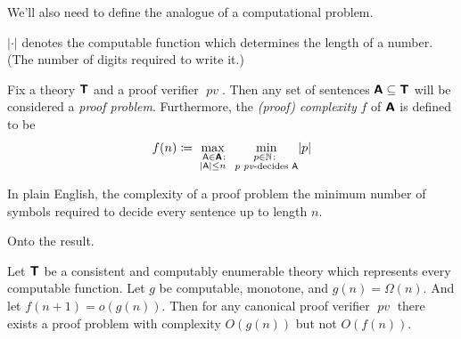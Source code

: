 \documentclass{article}
\theoremstyle{customstyle}
\newcommand{\fm}[1]{\mathsf{#1}}
\DeclareMathOperator{\pc}{\mathit{pv}}
\newcommand{\T}{\textbf{\textsf{T}}}
\newcommand{\A}{\textbf{\textsf{A}}}
\begin{document}
We'll also need to define the analogue of a computational problem.

\begin{definition}
  $\lvert \cdot \rvert$ denotes the computable function which determines the length of a number. (The number of digits required to write it.)
\end{definition}

\begin{definition}
  Fix a theory $\T$ and a proof verifier $\pc$. Then any set of sentences $\A \subseteq \T$ will be considered a \emph{proof problem}. Furthermore, the \textit{(proof) complexity} $f$ of $\A$ is defined to be
  \[
    f(n) \coloneqq \max_{\substack{\enskip\fm{A} \in \A \colon\\ \lvert \fm{A} \rvert \leq n}} \; \min_{\substack{p \in \mathbb{N} \colon\\ p \text{ $\pc$-decides } \fm{A}}} \lvert p \rvert
  \]
\end{definition}
In plain English, the complexity of a proof problem the minimum number of symbols required to decide every sentence up to length $n$.

Onto the result.

\begin{theorem}
  Let $\T$ be a consistent and computably enumerable theory which represents every computable function. Let $g$ be computable, monotone, and $g(n) = \Omega(n)$. And let $f(n+1) = o(g(n))$. Then for any canonical proof verifier $\pc$ there exists a proof problem with complexity $O(g(n))$ but not $O(f(n))$.
\end{theorem}
\end{document}
